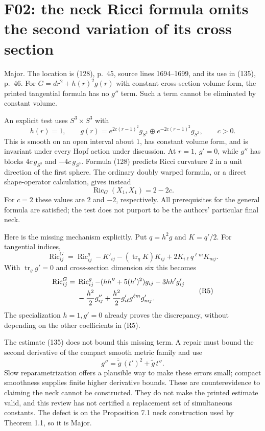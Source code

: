 \documentclass[10pt]{article}
\begin{document}
\section*{F02: the neck Ricci formula omits the second variation of its cross section}
Major. The location is (128), p. 45, source lines 1694–1699, and its use in (135), p. 46. For \(G=dr^2+h(r)^2g(r)\) with constant cross-section volume form, the printed tangential formula has no \(g''\) term. Such a term cannot be eliminated by constant volume.\par
An explicit test uses \(S^3\times S^3\) with \[h(r)=1,\qquad
 g(r)=e^{2c(r-1)^2}g_{S^3}\oplus e^{-2c(r-1)^2}g_{S^3},\qquad c>0.
 \tag{R3}\] This is smooth on an open interval about \(1\), has constant volume form, and is invariant under every Hopf action under discussion. At \(r=1\), \(g'=0\), while \(g''\) has blocks \(4c\,g_{S^3}\) and \(-4c\,g_{S^3}\). Formula (128) predicts Ricci curvature \(2\) in a unit direction of the first sphere. The ordinary doubly warped formula, or a direct shape-operator calculation, gives instead \[\operatorname{Ric}_G(X_1,X_1)=2-2c.
 \tag{R4}\] For \(c=2\) these values are \(2\) and \(-2\), respectively. All prerequisites for the general formula are satisfied; the test does not purport to be the authors’ particular final neck.\par
Here is the missing mechanism explicitly. Put \(q=h^2g\) and \(K=q'/2\). For tangential indices, \[\operatorname{Ric}^G_{ij}=\operatorname{Ric}^{q}_{ij}-K'_{ij}
       -(\operatorname{tr}_q K)K_{ij}+2K_{i\ell}q^{\ell m}K_{mj}.\] With \(\operatorname{tr}_g g'=0\) and cross-section dimension six this becomes \[\begin{aligned}
 \operatorname{Ric}^G_{ij}={}&\operatorname{Ric}^g_{ij}
 -(hh''+5(h')^2)g_{ij}-3hh'g'_{ij}\notag\\
 &-\frac{h^2}{2}g''_{ij}
   +\frac{h^2}{2}g'_{i\ell}g^{\ell m}g'_{mj}.
 \end{aligned}\tag{R5}\] The specialization \(h=1,g'=0\) already proves the discrepancy, without depending on the other coefficients in (R5).\par
The estimate (135) does not bound this missing term. A repair must bound the second derivative of the compact smooth metric family and use \[g''=\ddot{\widetilde g}\,(t')^2+\dot{\widetilde g}\,t''.\] Slow reparametrization offers a plausible way to make these errors small; compact smoothness supplies finite higher derivative bounds. These are counterevidence to claiming the neck cannot be constructed. They do not make the printed estimate valid, and this review has not certified a replacement set of simultaneous constants. The defect is on the Proposition 7.1 neck construction used by Theorem 1.1, so it is Major.\par
\end{document}
